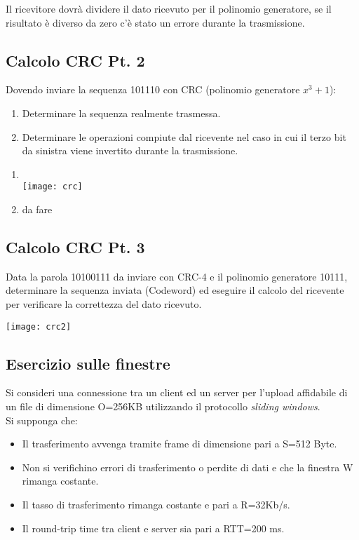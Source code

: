         Il ricevitore dovrà dividere il dato ricevuto per il polinomio generatore, se il risultato è diverso da zero c'è stato un errore durante la trasmissione.
    \subsection{Calcolo CRC Pt. 2}
        \problem
        Dovendo inviare la sequenza 101110 con CRC (polinomio generatore $x^3+1$):
        \begin{enumerate}
            \item Determinare la sequenza realmente trasmessa.
            \item Determinare le operazioni compiute dal ricevente nel caso in cui il terzo bit da sinistra viene invertito durante la trasmissione.
        \end{enumerate}

        \solution
        \begin{enumerate}
            \item \mbox{}\\\texttt{[image: crc]}
            \item da fare
        \end{enumerate}

    \subsection{Calcolo CRC Pt. 3}
        \problem
        Data la parola 10100111 da inviare con CRC-4  e il polinomio generatore 10111, determinare la sequenza inviata (Codeword) ed eseguire il calcolo del ricevente per verificare la correttezza del dato ricevuto.

        \solution
        \texttt{[image: crc2]}

    \subsection{Esercizio sulle finestre}
        \problem
        Si consideri una connessione  tra un client ed un server per l'upload affidabile di un file di dimensione O=256KB utilizzando il protocollo \textit{sliding windows}. \\
        Si supponga che:
        \begin{itemize}
            \item Il trasferimento avvenga tramite frame di dimensione pari a S=512 Byte.
            \item Non si verifichino errori di trasferimento o perdite di dati e che la finestra W rimanga costante.
            \item Il tasso di trasferimento rimanga costante e pari a R=32Kb/s.
            \item Il round-trip time tra client e server sia pari a RTT=200 ms.
        \end{itemize}
        
